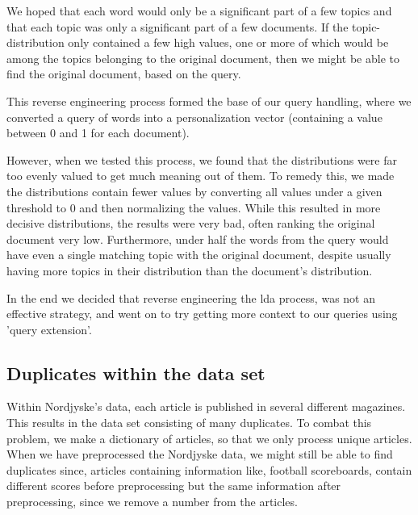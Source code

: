 We hoped that each word would only be a significant part of a few topics and that each topic was only a significant part of a few documents.
If the topic-distribution only contained a few high values, one or more of which would be among the topics belonging to the original document, then we might be able to find the original document, based on the query.

This reverse engineering process formed the base of our query handling, where we converted a query of words into a personalization vector (containing a value between 0 and 1 for each document).

However, when we tested this process, we found that the distributions were far too evenly valued to get much meaning out of them.
To remedy this, we made the distributions contain fewer values by converting all values under a given threshold to 0 and then normalizing the values.
While this resulted in more decisive distributions, the results were very bad, often ranking the original document very low.
Furthermore, under half the words from the query would have even a single matching topic with the original document, despite usually having more topics in their distribution than the document's distribution.
 
In the end we decided that reverse engineering the \gls{lda} process, was not an effective strategy, and went on to try getting more context to our queries using 'query extension'.


\subsection{Duplicates within the data set}
Within Nordjyske's data, each article is published in several different magazines. 
This results in the data set consisting of many duplicates. 
To combat this problem, we make a dictionary of articles, so that we only process unique articles.
When we have preprocessed the Nordjyske data, we might still be able to find duplicates since, articles containing information like, football scoreboards, contain different scores before preprocessing but the same information after preprocessing, since we remove a number from the articles.
